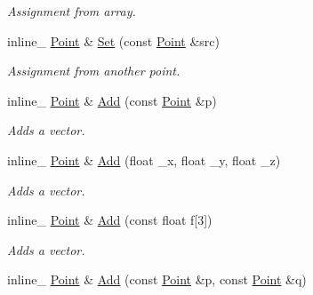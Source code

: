\begin{DoxyCompactItemize}
\begin{DoxyCompactList}\small\item\em Assignment from array. \end{DoxyCompactList}\item 
\hypertarget{class_point_ab4797efd8edaaee5f0dbea5adea17979}{inline\+\_\+ \hyperlink{class_point}{Point} \& \hyperlink{class_point_ab4797efd8edaaee5f0dbea5adea17979}{Set} (const \hyperlink{class_point}{Point} \&src)}\label{class_point_ab4797efd8edaaee5f0dbea5adea17979}

\begin{DoxyCompactList}\small\item\em Assignment from another point. \end{DoxyCompactList}\item 
\hypertarget{class_point_a8f6c315514035e19a732196dfdab8b9a}{inline\+\_\+ \hyperlink{class_point}{Point} \& \hyperlink{class_point_a8f6c315514035e19a732196dfdab8b9a}{Add} (const \hyperlink{class_point}{Point} \&p)}\label{class_point_a8f6c315514035e19a732196dfdab8b9a}

\begin{DoxyCompactList}\small\item\em Adds a vector. \end{DoxyCompactList}\item 
\hypertarget{class_point_a665a3c54701c9eccdec6c77ff33ac320}{inline\+\_\+ \hyperlink{class_point}{Point} \& \hyperlink{class_point_a665a3c54701c9eccdec6c77ff33ac320}{Add} (float \+\_\+x, float \+\_\+y, float \+\_\+z)}\label{class_point_a665a3c54701c9eccdec6c77ff33ac320}

\begin{DoxyCompactList}\small\item\em Adds a vector. \end{DoxyCompactList}\item 
\hypertarget{class_point_a1c1d68b7edfdc9157bd833597c1bb4c5}{inline\+\_\+ \hyperlink{class_point}{Point} \& \hyperlink{class_point_a1c1d68b7edfdc9157bd833597c1bb4c5}{Add} (const float f\mbox{[}3\mbox{]})}\label{class_point_a1c1d68b7edfdc9157bd833597c1bb4c5}

\begin{DoxyCompactList}\small\item\em Adds a vector. \end{DoxyCompactList}\item 
\hypertarget{class_point_a973e7eb0cc3ea025807d02c318ffe30f}{inline\+\_\+ \hyperlink{class_point}{Point} \& \hyperlink{class_point_a973e7eb0cc3ea025807d02c318ffe30f}{Add} (const \hyperlink{class_point}{Point} \&p, const \hyperlink{class_point}{Point} \&q)}\label{class_point_a973e7eb0cc3ea025807d02c318ffe30f}


\end{DoxyCompactItemize}
